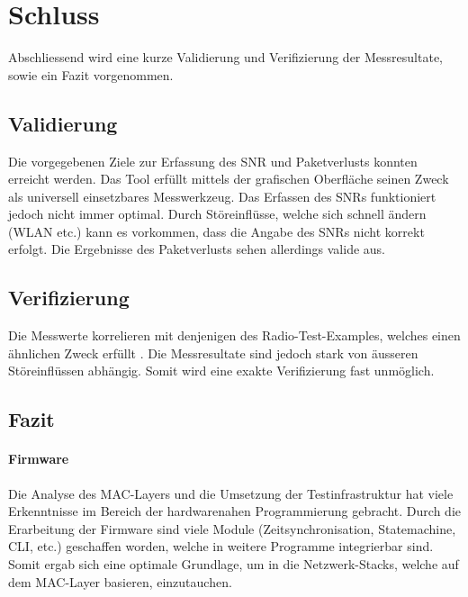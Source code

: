 \newpage
\section{Schluss}\label{sec:SchlussP2P}

Abschliessend wird eine kurze Validierung und Verifizierung der Messresultate, sowie ein Fazit vorgenommen.

\subsection{Validierung}\label{subsec:P2PValidierung}
Die vorgegebenen Ziele zur Erfassung des SNR und Paketverlusts konnten erreicht werden.
Das Tool erfüllt mittels der grafischen Oberfläche seinen Zweck als universell einsetzbares Messwerkzeug.
Das Erfassen des SNRs funktioniert jedoch nicht immer optimal.
Durch Störeinflüsse, welche sich schnell ändern (WLAN etc.) kann es vorkommen, dass die Angabe des SNRs nicht korrekt erfolgt.
Die Ergebnisse des Paketverlusts sehen allerdings valide aus. 




\subsection{Verifizierung}\label{subsec:P2PVerifizierung}
Die Messwerte korrelieren mit denjenigen des Radio-Test-Examples, welches einen ähnlichen Zweck erfüllt \cite{nrf_connect_sdk_radio_test_example_2020}.
Die Messresultate sind jedoch stark von äusseren Störeinflüssen abhängig. Somit wird eine exakte Verifizierung fast unmöglich.




\subsection{Fazit}\label{subsec:FazitP2P}
\paragraph{Firmware}
Die Analyse des MAC-Layers und die Umsetzung der Testinfrastruktur hat viele Erkenntnisse im Bereich der hardwarenahen Programmierung gebracht. Durch die Erarbeitung der Firmware sind viele Module (Zeitsynchronisation, Statemachine, CLI, etc.) geschaffen worden, welche in weitere Programme integrierbar sind. Somit ergab sich eine optimale Grundlage, um in die Netzwerk-Stacks, welche auf dem MAC-Layer basieren, einzutauchen.

